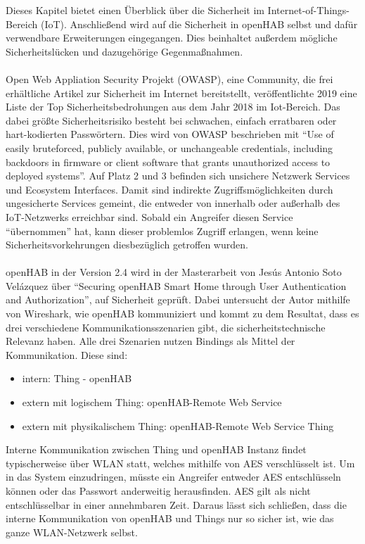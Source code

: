 Dieses Kapitel bietet einen Überblick über die Sicherheit im Internet-of-Things-Bereich (IoT).  Anschließend wird auf die Sicherheit in openHAB selbst und dafür verwendbare Erweiterungen eingegangen. Dies beinhaltet außerdem mögliche Sicherheitslücken und dazugehörige Gegenmaßnahmen.\\
\\
Open Web Appliation Security Projekt (OWASP), eine Community, die frei erhältliche Artikel zur Sicherheit im Internet bereitstellt, veröffentlichte 2019 eine Liste der Top Sicherheitsbedrohungen aus dem Jahr 2018 im Iot-Bereich.\cite{OWASP01:IOT} Das dabei größte Sicherheitsrisiko besteht bei schwachen, einfach erratbaren oder hart-kodierten Passwörtern. Dies wird von OWASP beschrieben mit "`Use of easily bruteforced, publicly available, or unchangeable credentials, including backdoors in firmware or client software that grants unauthorized access to deployed systems"'.\cite{OWASP01:IOT} Auf Platz 2 und 3 befinden sich unsichere Netzwerk Services und Ecosystem Interfaces. Damit sind indirekte Zugriffsmöglichkeiten durch ungesicherte Services gemeint, die entweder von innerhalb oder außerhalb des IoT-Netzwerks erreichbar sind. Sobald ein Angreifer diesen Service "`übernommen"' hat, kann dieser problemlos Zugriff erlangen, wenn keine Sicherheitsvorkehrungen diesbezüglich getroffen wurden.\\
\\
openHAB in der Version 2.4 wird in der Masterarbeit von Jesús Antonio Soto Velázquez über "`Securing openHAB Smart Home through User Authentication and Authorization"', auf Sicherheit geprüft.\cite{MA01:OPH} Dabei untersucht der Autor mithilfe von Wireshark, wie openHAB kommuniziert und kommt zu dem Resultat, dass es drei verschiedene Kommunikationsszenarien gibt, die sicherheitstechnische Relevanz haben. Alle drei Szenarien nutzen Bindings als Mittel der Kommunikation. Diese sind:
\begin{itemize}
	\item intern: Thing - openHAB
	\item extern mit logischem Thing: openHAB-Remote Web Service
	\item extern mit physikalischem Thing: openHAB-Remote Web Service Thing
\end{itemize}	
Interne Kommunikation zwischen Thing und openHAB Instanz findet typischerweise über WLAN statt, welches mithilfe von AES verschlüsselt ist. Um in das System einzudringen, müsste ein Angreifer entweder AES entschlüsseln können oder das Passwort anderweitig herausfinden. AES gilt als nicht entschlüsselbar in einer annehmbaren Zeit. Daraus lässt sich schließen, dass die interne Kommunikation von openHAB und Things nur so sicher ist, wie das ganze WLAN-Netzwerk selbst.\\
